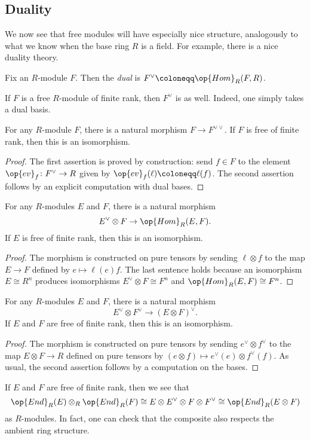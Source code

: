 \documentclass[../notes.tex]{subfiles}
\begin{document}
\subsection{Duality}
We now see that free modules will have especially nice structure, analogously to what we know when the base ring $R$ is a field. For example, there is a nice duality theory.
\begin{definition}[dual]
	Fix an $R$-module $F$. Then the \textit{dual} is $F^\lor\coloneqq\op{Hom}_R(F,R)$.
\end{definition}
\begin{remark}
	If $F$ is a free $R$-module of finite rank, then $F^\lor$ is as well. Indeed, one simply takes a dual basis.
\end{remark}
\begin{lemma}
	For any $R$-module $F$, there is a natural morphism $F\to F^{\lor\lor}$. If $F$ is free of finite rank, then this is an isomorphism.
\end{lemma}
\begin{proof}
	The first assertion is proved by construction: send $f\in F$ to the element $\op{ev}_f\colon F^\lor\to R$ given by $\op{ev}_f(\ell)\coloneqq\ell(f)$. The second assertion follows by an explicit computation with dual bases.
\end{proof}
\begin{lemma}
	For any $R$-modules $E$ and $F$, there is a natural morphism
	\[E^\lor\otimes F\to\op{Hom}_R(E,F).\]
	If $E$ is free of finite rank, then this is an isomorphism.
\end{lemma}
\begin{proof}
	The morphism is constructed on pure tensors by sending $\ell\otimes f$ to the map $E\to F$ defined by $e\mapsto\ell(e)f$. The last sentence holds because an isomorphism $E\cong R^n$ produces isomorphisms $E^\lor\otimes F\cong F^n$ and $\op{Hom}_R(E,F)\cong F^n$.
\end{proof}
\begin{lemma}
	For any $R$-modules $E$ and $F$, there is a natural morphism
	\[E^\lor\otimes F^\lor\to(E\otimes F)^\lor.\]
	If $E$ and $F$ are free of finite rank, then this is an isomorphism.
\end{lemma}
\begin{proof}
	The morphism is constructed on pure tensors by sending $e^\lor\otimes f^\lor$ to the map $E\otimes F\to R$ defined on pure tensors by $(e\otimes f)\mapsto e^\lor(e)\otimes f^\lor(f)$. As usual, the second assertion follows by a computation on the bases.
\end{proof}
\begin{example}
	If $E$ and $F$ are free of finite rank, then we see that
	\[\op{End}_R(E)\otimes_R\op{End}_R(F)\cong E\otimes E^\lor\otimes F\otimes F^\lor\cong\op{End}_R(E\otimes F)\]
	as $R$-modules. In fact, one can check that the composite also respects the ambient ring structure.
\end{example}
\end{document}
